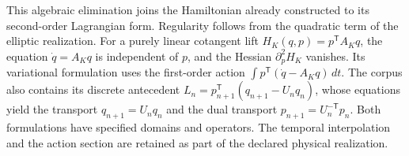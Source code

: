 This algebraic elimination joins the Hamiltonian already constructed to
its second-order Lagrangian form. Regularity follows from the
quadratic term of the elliptic realization. For a purely linear
cotangent lift \(H_K(q,p)=p^{\mathsf T}A_Kq\), the
equation \(\dot q=A_Kq\) is independent of \(p\), and the Hessian
\(\partial_p^2H_K\) vanishes. Its variational formulation uses the
first-order action \(\int p^{\mathsf T}(\dot q-A_Kq)\,dt\).
The corpus also contains its discrete antecedent
\(L_n=p_{n+1}^{\mathsf T}(q_{n+1}-U_nq_n)\), whose equations
yield the transport \(q_{n+1}=U_nq_n\) and the dual transport
\(p_{n+1}=U_n^{-\mathsf T}p_n\). Both formulations have
specified domains and operators. The temporal interpolation and the
action section are retained as part of the declared physical
realization.
